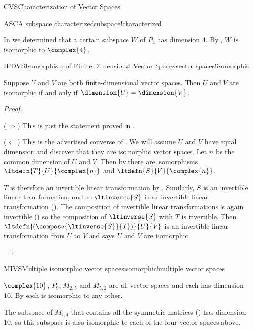 \begin{subsect}{CVS}{Characterization of Vector Spaces}
%
%
\begin{example}{ASC}{A subspace characterized}{subspace!characterized}
\begin{para}In  we determined that a certain subspace $W$ of $P_4$ has dimension $4$.  By , $W$ is isomorphic to $\complex{4}$.\end{para}
\end{example}
%
\begin{theorem}{IFDVS}{Isomorphism of Finite Dimensional Vector Spaces}{vector spaces!isomorphic}
\begin{para}Suppose $U$ and $V$ are both finite-dimensional vector spaces.  Then $U$ and $V$ are isomorphic if and only if $\dimension{U}=\dimension{V}$.\end{para}
\end{theorem}
%
\begin{proof}
\begin{para}($\Rightarrow$)  This is just the statement proved in .\end{para}
%
\begin{para}($\Leftarrow$)  This is the advertised converse of .  We will assume $U$ and $V$ have equal dimension and discover that they are isomorphic vector spaces.  Let $n$ be the common dimension of $U$ and $V$.  Then by  there are isomorphisms $\ltdefn{T}{U}{\complex{n}}$ and $\ltdefn{S}{V}{\complex{n}}$.\end{para}
%
\begin{para}$T$ is therefore an invertible linear transformation by .  Similarly, $S$ is an invertible linear transformation, and so $\ltinverse{S}$ is  an invertible linear transformation ().  The composition of invertible linear transformations is again invertible ()
so the composition of $\ltinverse{S}$ with $T$ is invertible.  Then $\ltdefn{\left(\compose{\ltinverse{S}}{T}\right)}{U}{V}$ is an invertible linear transformation from $U$ to $V$ and  says $U$ and $V$ are isomorphic.\end{para}
%
\end{proof}
%
\begin{example}{MIVS}{Multiple isomorphic vector spaces}{isomorphic!multiple vector spaces}
\begin{para}$\complex{10}$, $P_{9}$, $M_{2,5}$ and $M_{5,2}$ are all vector spaces and each has dimension 10.  By  each is isomorphic to any other.\end{para}
%
\begin{para}The subspace of $M_{4,4}$ that contains all the symmetric matrices () has dimension $10$, so this subspace is also isomorphic to each of the four vector spaces above.\end{para}
\end{example}
%
\end{subsect}
